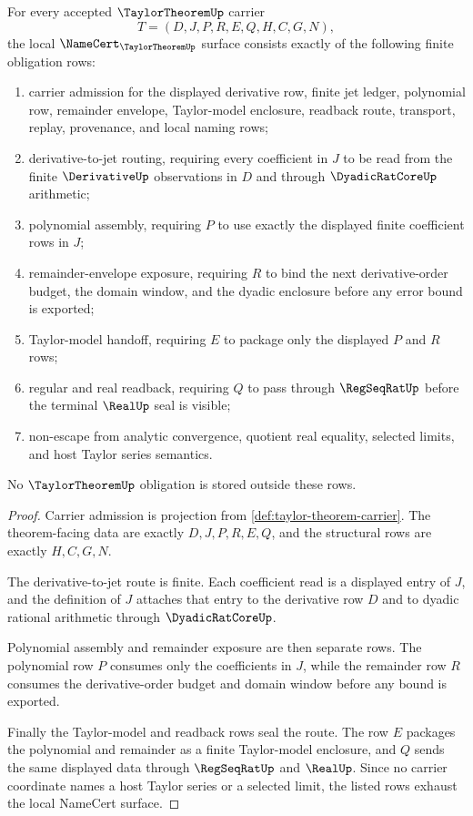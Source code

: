 \begin{theorem}
\label{thm:taylor-theorem-namecert-obligations}
For every accepted $\TaylorTheoremUp$ carrier
$$
T=(D,J,P,R,E,Q,H,C,G,N),
$$
the local $\NameCert_{\TaylorTheoremUp}$ surface consists exactly of the following finite obligation rows:
\begin{enumerate}
\item carrier admission for the displayed derivative row, finite jet ledger, polynomial row, remainder envelope, Taylor-model enclosure, readback route, transport, replay, provenance, and local naming rows;
\item derivative-to-jet routing, requiring every coefficient in $J$ to be read from the finite $\DerivativeUp$ observations in $D$ and through $\DyadicRatCoreUp$ arithmetic;
\item polynomial assembly, requiring $P$ to use exactly the displayed finite coefficient rows in $J$;
\item remainder-envelope exposure, requiring $R$ to bind the next derivative-order budget, the domain window, and the dyadic enclosure before any error bound is exported;
\item Taylor-model handoff, requiring $E$ to package only the displayed $P$ and $R$ rows;
\item regular and real readback, requiring $Q$ to pass through $\RegSeqRatUp$ before the terminal $\RealUp$ seal is visible;
\item non-escape from analytic convergence, quotient real equality, selected limits, and host Taylor series semantics.
\end{enumerate}
No $\TaylorTheoremUp$ obligation is stored outside these rows.
\end{theorem}
\begin{proof}
Carrier admission is projection from \autoref{def:taylor-theorem-carrier}. The theorem-facing data are exactly $D,J,P,R,E,Q$, and the structural rows are exactly $H,C,G,N$.

The derivative-to-jet route is finite. Each coefficient read is a displayed entry of $J$, and the definition of $J$ attaches that entry to the derivative row $D$ and to dyadic rational arithmetic through $\DyadicRatCoreUp$.

Polynomial assembly and remainder exposure are then separate rows. The polynomial row $P$ consumes only the coefficients in $J$, while the remainder row $R$ consumes the derivative-order budget and domain window before any bound is exported.

Finally the Taylor-model and readback rows seal the route. The row $E$ packages the polynomial and remainder as a finite Taylor-model enclosure, and $Q$ sends the same displayed data through $\RegSeqRatUp$ and $\RealUp$. Since no carrier coordinate names a host Taylor series or a selected limit, the listed rows exhaust the local NameCert surface.
\end{proof}

